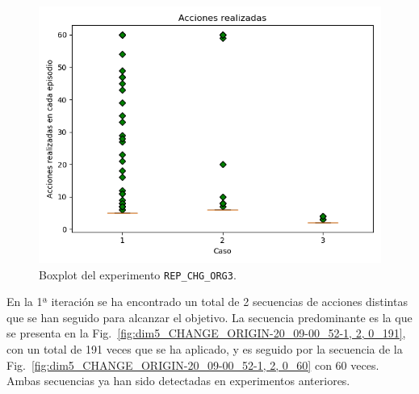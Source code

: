 \begin{figure}
    \centering
    \includegraphics[scale=0.4]{cap5_experimentacion/images/CHANGE_ORIGIN-20_09-00_54-1, 2, 0_boxplot.png}
    \caption{Boxplot del experimento \texttt{REP\_CHG\_ORG3}.}
    \label{fig:CHANGE_ORIGIN-20_09-00_52-1, 2, 0_boxplot}
\end{figure}

En la 1ª iteración se ha encontrado un total de 2 secuencias de acciones distintas que se han seguido para alcanzar el objetivo. La secuencia predominante es la que se presenta en la Fig.~\ref{fig:dim5_CHANGE_ORIGIN-20_09-00_52-1, 2, 0_191}, con un total de 191 veces que se ha aplicado, y es seguido por la secuencia de la Fig.~\ref{fig:dim5_CHANGE_ORIGIN-20_09-00_52-1, 2, 0_60} con 60 veces. Ambas secuencias ya han sido detectadas en experimentos anteriores. \\


